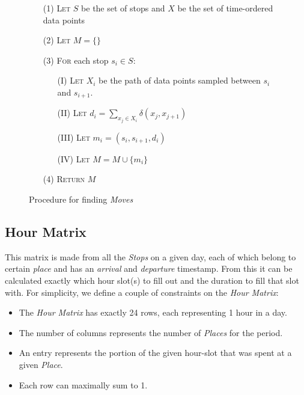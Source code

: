 \begin{figure}[h]
    \centering
    \begin{center}
    \begin{itemize}
    \item[(1)] \textsc{Let} $S$ be the set of stops and $X$ be the set of time-ordered data points
    \item[(2)] \textsc{Let} $M = \{ \}$
    \item[(3)] \textsc{For} each stop $s_i \in S$:
    \begin{itemize}
        \item[(I)] \textsc{Let} $X_i$ be the path of data points sampled between $s_i$ and $s_{i+1}$.
        \item[(II)] \textsc{Let} $d_i = \sum_{x_j \in X_i} \delta(x_j, x_{j+1})$ 
        \item[(III)] \textsc{Let} $m_i = (s_i, s_{i+1}, d_i)$ 
        \item[(IV)] \textsc{Let} $M = M \cup \{m_i\}$ 
    \end{itemize}
    \item[(4)] \textsc{Return} $M$
\end{itemize} 
\end{center}
    \caption{Procedure for finding \textit{Moves}}
    \label{fig:find_moves}
\end{figure}

\subsection{Hour Matrix}
This matrix is made from all the \textit{Stops} on a given day, each of which belong to certain \textit{place} and has an \textit{arrival} and \textit{departure} timestamp. From this it can be calculated exactly which hour slot(s) to fill out and the duration to fill that slot with. For simplicity, we define a couple of constraints on the \textit{Hour Matrix}:

\begin{itemize}
    \item The \textit{Hour Matrix} has exactly 24 rows, each representing 1 hour in a day.
    \item The number of columns represents the number of \textit{Places} for the period. 
    \item An entry represents the portion of the given hour-slot that was spent at a given \textit{Place}.
    \item Each row can maximally sum to 1.
\end{itemize}

